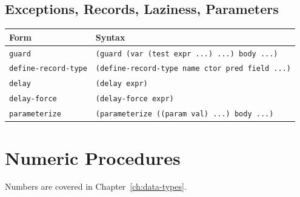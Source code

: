 \subsection*{Exceptions, Records, Laziness, Parameters}

\begin{center}
\small
\begin{tabularx}{\textwidth}{@{}lY@{}}
\textbf{Form} & \textbf{Syntax} \\
\hline
\texttt{guard} & \texttt{(guard (var (test expr ...) ...) body ...)} \\
\texttt{define-record-type} & \texttt{(define-record-type name ctor pred field ...)} \\
\texttt{delay} & \texttt{(delay expr)} \\
\texttt{delay-force} & \texttt{(delay-force expr)} \\
\texttt{parameterize} & \texttt{(parameterize ((param val) ...) body ...)} \\
\end{tabularx}
\end{center}

\section{Numeric Procedures}

Numbers are covered in Chapter~\ref{ch:data-types}.

